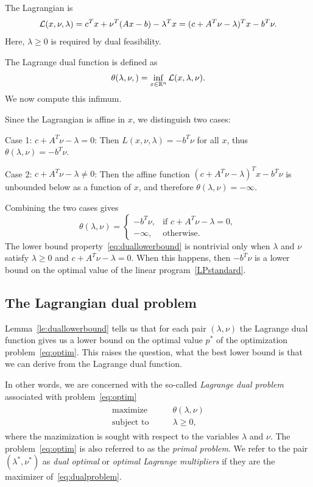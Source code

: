 The Lagrangian is
$$
\mathcal{L}(x,\nu,\lambda)
= c^T x + \nu^T (Ax - b) - \lambda^T x 
= (c + A^T \nu - \lambda)^T x - b^T \nu.
$$
Here, $\lambda \ge 0$ is required by dual feasibility.


The Lagrange dual function is defined as
$$
\theta(\lambda, \nu,)
= \inf_{x \in \mathbb{R}^n} \mathcal{L}(x,\lambda,\nu).
$$
We now compute this infimum.

Since the Lagrangian is affine in $x$, we distinguish two cases:

\noindent
Case 1: $c + A^T \nu - \lambda = 0$:
Then $L(x,\nu,\lambda) = - b^T \nu$ for all $x$, thus
$\theta(\lambda,\nu) = -b^T \nu$.

\noindent
Case 2: $c + A^T \nu - \lambda \neq 0$:
Then the affine function $(c + A^T \nu - \lambda)^T x - b^T \nu$ is unbounded below as a function of $x$, and therefore
$\theta(\lambda,\nu) = -\infty$.

Combining the two cases gives
\begin{equation}\label{LPdualfunction}
    \theta(\lambda,\nu)
=
\begin{cases}
-b^T \nu, & \text{if } c + A^T \nu - \lambda = 0, \\
-\infty, & \text{otherwise}.
\end{cases}
\end{equation}
The lower bound property~\eqref{eq:duallowerbound} is nontrivial only when $\lambda$ and $\nu$ satisfy $\lambda \ge 0$ and
$c + A^T \nu - \lambda = 0$. When this happens, then 
$-b^T \nu$ is a lower bound on the optimal
value of the linear program~\eqref{LPstandard}.




\subsection{The Lagrangian dual problem}

Lemma~\ref{le:duallowerbound} tells us that for each pair $(\lambda,\nu)$ the Lagrange dual function gives us a lower bound on the optimal value $p^*$
of the optimization problem~\eqref{eq:optim}. This raises the question, what the best lower bound is that we can derive  from the Lagrange dual function.

In other words, we are concerned with the so-called {\em Lagrange dual problem} associated with problem~\eqref{eq:optim} 
\begin{align}\label{eq:dualproblem}
\begin{split}
 \text{maximize} & \qquad   \theta(\lambda,\nu)  \\
 \text{subject to} & \qquad \lambda \ge 0,
\end{split}
\end{align}
where the mazimization is sought with respect to the variables $\lambda$ and $\nu$.
The problem~\eqref{eq:optim} is also referred to as the {\em primal problem}.
We refer to the pair $(\lambda^*,\nu^*)$ as {\em dual optimal} or {\em optimal Lagrange multipliers}
if they are the maximizer of~\eqref{eq:dualproblem}.

